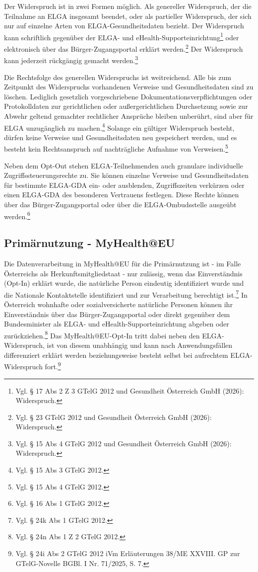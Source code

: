 Der Widerspruch ist in zwei Formen möglich. Als genereller Widerspruch, der die Teilnahme an ELGA insgesamt beendet, oder als partieller Widerspruch, der sich nur auf einzelne Arten von ELGA-Gesundheitsdaten bezieht. Der Widerspruch kann schriftlich gegenüber der ELGA- und eHealth-Supporteinrichtung\footnote{Vgl. § 17 Abs 2 Z 3 GTelG 2012 und Gesundheit Österreich GmbH (2026): Widerspruch.} oder elektronisch über das Bürger-Zugangsportal erklärt werden.\footnote{Vgl. § 23 GTelG 2012 und Gesundheit Österreich GmbH (2026): Widerspruch.} Der Widerspruch kann jederzeit rückgängig gemacht werden.\footnote{Vgl. § 15 Abs 4 GTelG 2012 und Gesundheit Österreich GmbH (2026): Widerspruch.}

Die Rechtsfolge des generellen Widerspruchs ist weitreichend. Alle bis zum Zeitpunkt des Widerspruchs vorhandenen Verweise und Gesundheitsdaten sind zu löschen. Lediglich gesetzlich vorgeschriebene Dokumentationsverpflichtungen oder Protokolldaten zur gerichtlichen oder außergerichtlichen Durchsetzung sowie zur Abwehr geltend gemachter
rechtlicher Ansprüche bleiben unberührt, sind aber für ELGA unzugänglich zu machen.\footnote{Vgl. § 15 Abs 3 GTelG 2012.} Solange ein gültiger Widerspruch besteht, dürfen keine Verweise und Gesundheitsdaten neu gespeichert werden, und es besteht kein Rechtsanspruch auf nachträgliche Aufnahme von Verweisen.\footnote{Vgl. § 15 Abs 4 GTelG 2012.}

Neben dem Opt-Out stehen ELGA-Teilnehmenden auch granulare individuelle Zugriffssteuerungsrechte zu. Sie können einzelne Verweise und Gesundheitsdaten für bestimmte ELGA-GDA ein- oder ausblenden, Zugriffszeiten verkürzen oder einen ELGA-GDA des besonderen Vertrauens festlegen. Diese Rechte können über das Bürger-Zugangsportal oder über die ELGA-Ombudsstelle ausgeübt werden.\footnote{Vgl. § 16 Abs 1 GTelG 2012.}

\subsection{Primärnutzung - MyHealth@EU}

Die Datenverarbeitung in MyHealth@EU für die Primärnutzung ist - im Falle Österreichs als Herkunftsmitgliedstaat - nur zulässig, wenn das Einverständnis (Opt-In) erklärt wurde, die natürliche Person eindeutig identifiziert wurde und die Nationale Kontaktstelle identifiziert und zur Verarbeitung berechtigt ist.\footnote{Vgl. § 24k Abs 1 GTelG 2012.} In Österreich wohnhafte oder sozialversicherte natürliche Personen können ihr Einverständnis über das Bürger-Zugangsportal oder direkt gegenüber dem Bundesminister als ELGA- und eHealth-Supporteinrichtung abgeben oder zurückziehen.\footnote{Vgl. § 24n Abs 1 Z 2 GTelG 2012.} Das MyHealth@EU-Opt-In tritt dabei neben den ELGA-Widerspruch, ist von diesem unabhängig und kann nach Anwendungsfällen differenziert erklärt werden beziehungsweise besteht selbst bei aufrechtem ELGA-Widerspruch fort.\footnote{Vgl. § 24i Abs 2 GTelG 2012 iVm Erläuterungen 38/ME XXVIII. GP zur GTelG-Novelle BGBl. I Nr. 71/2025, S. 7.}

